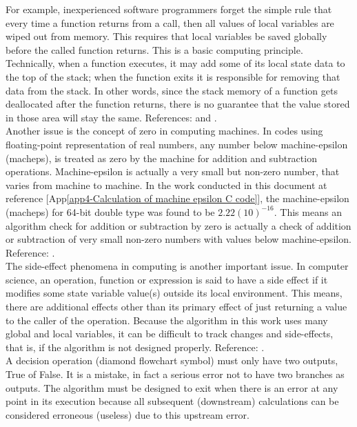For example, inexperienced software programmers forget the simple rule that every time a function returns from a call, then all values of local variables are wiped out from memory. This requires that local variables be saved globally before the called function returns. This is a basic computing principle. \\
	
Technically, when a function executes, it may add some of its local state data to the top of the stack; when the function exits it is responsible for removing that data from the stack. In other words, since the stack memory of a function gets deallocated after the function returns, there is no guarantee that the value stored in those area will stay the same. References: \cite{Wikipedia:2023A} and \cite{Chen:2023}. \\
	
Another issue is the concept of zero in computing machines. In codes using floating-point representation of real numbers, any number below machine-epsilon (macheps), is treated as zero by the machine for addition and subtraction operations. Machine-epsilon is actually a very small but non-zero number, that varies from machine to machine. In the work conducted in this document at reference [App\ref{app4-Calculation of machine epsilon C code}], the machine-epsilon (macheps) for 64-bit double type was found to be  $2.22(10)^{-16}$. This means an algorithm check for addition or subtraction by zero is actually a check of addition or subtraction of very small non-zero numbers with values below machine-epsilon. Reference: \cite{Wikipedia:2023B}. \\
	
The side-effect phenomena in computing is another important issue. In computer science, an operation, function or expression is said to have a side effect if it modifies some state variable value(s) outside its local environment. This means, there are additional effects other than its primary effect of just returning a value to the caller of the operation. Because the algorithm in this work uses many global and local variables, it can be difficult to track changes and side-effects, that is, if the algorithm is not designed properly. Reference: \cite{Wikipedia:2023C}. \\
	
A decision operation (diamond flowchart symbol) must only have two outputs, True of False. It is a mistake, in fact a serious error not to have two branches as outputs. The algorithm must be designed to exit when there is an error at any point in its execution because all subsequent (downstream) calculations can be considered erroneous (useless) due to this upstream error. \\ 
	
